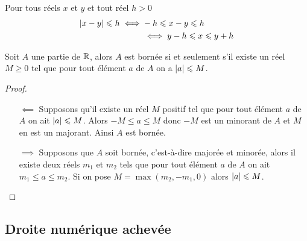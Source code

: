 \begin{prop}
  Pour tous réels $x$ et $y$ et tout réel $h>0$
  \begin{align}
    \left\lvert x-y\right\rvert\leqslant h \iff & -h \leqslant x-y \leqslant h\\
    &\iff y-h \leqslant x \leqslant y+h
  \end{align}
\end{prop}
\begin{prop}
  Soit $A$ une partie de $\mathbb{R}$, alors $A$ est bornée si et seulement s'il existe un réel $M\geqslant 0$ tel que pour tout élément $a$ de $A$ on a $\left\lvert a\right\rvert\leqslant M$.
\end{prop}
\begin{proof}
  \begin{itemize}
  \item[$\impliedby$] Supposons qu'il existe un réel $M$ positif tel que pour tout élément $a$ de $A$ on ait $\left\lvert a\right\rvert\leqslant M$. Alors $-M\leqslant a\leqslant M$ donc $-M$ est un minorant de $A$ et $M$ en est un majorant. Ainsi $A$ est bornée.
  \item[$\implies$] Supposons que $A$ soit bornée, c'est-à-dire majorée et minorée, alors il existe deux réels $m_1$ et $m_2$ tels que pour tout élément $a$ de $A$ on ait $m_1\leqslant a\leqslant m_2$. Si on pose $M=\max(m_2,-m_1,0)$ alors $\left\lvert a\right\rvert\leqslant M$.
  \end{itemize}
\end{proof}

\subsection{Droite numérique achevée}

